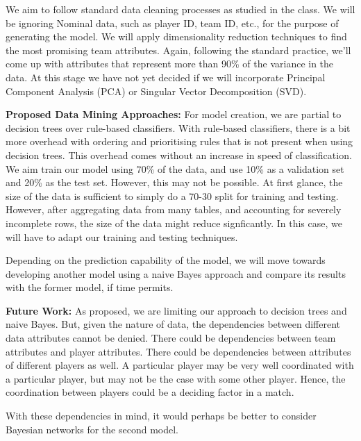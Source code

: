 \documentclass[11pt, letterpaper]{article}
\begin{document}
We aim to follow standard data cleaning processes as studied in the class.
We will be ignoring Nominal data, such as player ID, team ID, etc., for the purpose of generating the model.
We will apply dimensionality reduction techniques to find the most promising team attributes.
Again, following the standard practice, we'll come up with attributes that represent more than 90\% of the variance in the data.
At this stage we have not yet decided if we will incorporate Principal Component Analysis (PCA) or Singular Vector Decomposition (SVD).

\textbf{Proposed Data Mining Approaches:} For model creation, we are partial to decision trees over rule-based classifiers.
With rule-based classifiers, there is a bit more overhead with ordering and prioritising rules that is not present when using decision trees.
This overhead comes without an increase in speed of classification.
We aim train our model using 70\% of the data, and use 10\% as a validation set and 20\% as the test set.
However, this may not be possible.
At first glance, the size of the data is sufficient to simply do a 70-30 split for training and testing.
However, after aggregating data from many tables, and accounting for severely incomplete rows, the size of the data might reduce signficantly.
In this case, we will have to adapt our training and testing techniques.

Depending on the prediction capability of the model, we will move towards developing another model using a naive Bayes approach and compare its results with the former model, if time permits.

\textbf{Future Work:} As proposed, we are limiting our approach to decision trees and naive Bayes.
But, given the nature of data, the dependencies between different data attributes cannot be denied. There could be dependencies between team attributes and player attributes.
There could be dependencies between attributes of different players as well.
A particular player may be very well coordinated with a particular player, but may not be the case with some other player.
Hence, the coordination between players could be a deciding factor in a match.

With these dependencies in mind, it would perhaps be better to consider Bayesian networks for the second model.
\end{document}
